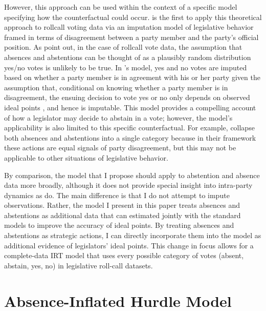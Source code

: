 	However, this approach can be used within the context of a specific model specifying how the counterfactual could occur. \textcite{rosas2015} is the first to apply this theoretical approach to rollcall voting data via an imputation model of legislative behavior framed in terms of disagreement between a party member and the party's official position.  As \textcite{rosas2015} point out, in the case of rollcall vote data, the assumption that absences and abstentions can be thought of as a plausibly random distribution yes/no votes is unlikely to be true. In \citeauthor{rosas2015}'s model, yes and no votes are imputed based on whether a party member is in agreement with his or her party given the assumption that, conditional on knowing whether a party member is in disagreement, the ensuing decision to vote yes or no only depends on observed ideal points \parencite{rubin2002}, and hence is imputable. This model provides a compelling account of how a legislator may decide to abstain in a vote; however, the model's applicability is also limited to this specific counterfactual. For example, \citeauthor{rosas2015} collapse both absences and abstentions into a single category because in their framework these actions are equal signals of party disagreement, but this may not be applicable to other situations of legislative behavior.
	
	By comparison, the model that I propose should apply to abstention and absence data more broadly, although it does not provide special insight into intra-party dynamics as \textcite{rosas2015} do. The main difference is that I do not attempt to impute observations. Rather, the model I present in this paper treats absences and abstentions as additional data that can estimated jointly with the standard models to improve the accuracy of ideal points. By treating absences and abstentions as strategic actions, I can directly incorporate them into the model as additional evidence of legislators' ideal points. This change in focus allows for a complete-data IRT model that uses every possible category of votes (absent, abstain, yes, no) in legislative roll-call datasets.
	
	
	
	\section{Absence-Inflated Hurdle Model}
	
